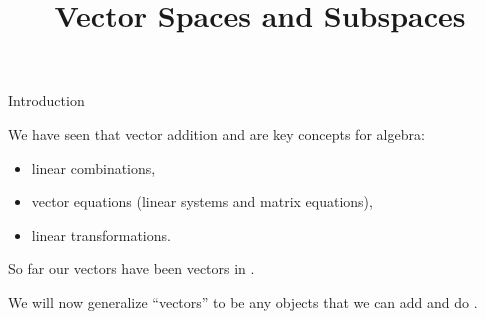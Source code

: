 \documentclass[xcolor=dvipsnames,aspectratio=169,t]{beamer}
\title{Vector Spaces and Subspaces}
\begin{document}
\maketitle

\begin{frame}{Introduction}
  \bigskip
  
  We have seen that \alert{vector addition} and  are key concepts for  algebra:
  \medskip
  
  \begin{itemize}
    \item linear combinations,
    \item vector equations (linear systems and matrix equations),
    \item linear transformations.
  \end{itemize}
  \bigskip
  
  \pause
  So far our vectors have been vectors in .
  \medskip
  
  We will now generalize \alert{``vectors''} to be any objects that we can \alert{add} and do .
\end{frame}
\end{document}
